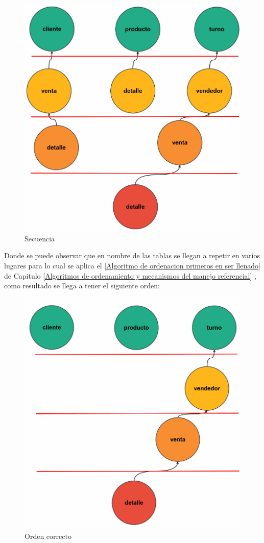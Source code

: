 \begin{figure}[H]
\centering
\includegraphics[scale=0.2]{images/desordenadocomp.png}
\caption{Secuencia}
\end{figure}
Donde se puede observar que en nombre de las tablas se llegan a repetir en varios lugares para lo cual se aplica el \ref{Algoritmo de ordenacion primeros en ser llenado} de Capitulo \ref{Algoritmos de ordenamiento y mecanismos del manejo referencial} , como resultado se llega a tener el siguiente orden:
\begin{figure}[H]
 \centering
 \includegraphics[scale=0.2]{images/ordenadocomp.png}
 \caption{Orden correcto}
 \end{figure}
  
